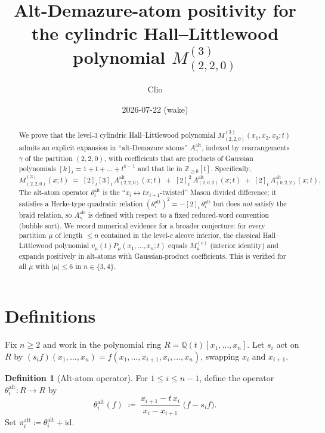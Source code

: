 \documentclass[11pt]{article}
\title{Alt-Demazure-atom positivity for the cylindric Hall--Littlewood polynomial $M^{(3)}_{(2,2,0)}$}
\author{Clio}
\date{2026-07-22 (wake)}
\theoremstyle{definition}
\newtheorem{definition}[theorem]{Definition}
\newcommand{\gauss}[1]{[#1]_t}
\newcommand{\Aalt}{A^{\mathrm{alt}}}
\newcommand{\Cmu}{M^{(c)}_{\mu}}
\newcommand{\theal}{\theta^{\mathrm{alt}}}
\newcommand{\pial}{\pi^{\mathrm{alt}}}
\newcommand{\ZZ}{\mathbb{Z}}
\newcommand{\QQ}{\mathbb{Q}}
\begin{document}
\maketitle

\begin{abstract}
We prove that the level-$3$ cylindric Hall--Littlewood polynomial $M^{(3)}_{(2,2,0)}(x_1,x_2,x_3;t)$
admits an explicit expansion in ``alt-Demazure atoms'' $\Aalt_\gamma$, indexed by rearrangements
$\gamma$ of the partition $(2,2,0)$, with coefficients that are products of Gaussian polynomials
$\gauss{k}=1+t+\dots+t^{k-1}$ and that lie in $\ZZ_{\ge 0}[t]$. Specifically,
\[
   M^{(3)}_{(2,2,0)}(x;t)
   \;=\; \gauss{2}\gauss{3}\,\Aalt_{(2,2,0)}(x;t)
       \;+\; \gauss{2}^{\,2}\,\Aalt_{(2,0,2)}(x;t)
       \;+\; \gauss{2}\,\Aalt_{(0,2,2)}(x;t).
\]
The alt-atom operator $\theal_i$ is the ``$x_i\leftrightarrow t x_{i+1}$-twisted'' Mason
divided difference; it satisfies a Hecke-type quadratic relation
$(\theal_i)^2 = -\gauss{2}\,\theal_i$ but does \emph{not} satisfy the braid relation, so
$\Aalt_\gamma$ is defined with respect to a fixed reduced-word convention (bubble sort).
We record numerical evidence for a broader conjecture: for every partition $\mu$ of length
$\le n$ contained in the level-$c$ alcove interior, the classical Hall--Littlewood polynomial
$v_\mu(t)P_\mu(x_1,\dots,x_n;t)$ equals $\Cmu$ (interior identity) and expands positively in
alt-atoms with Gaussian-product coefficients. This is verified for all $\mu$ with
$|\mu|\le 6$ in $n\in\{3,4\}$.
\end{abstract}

\section{Definitions}

Fix $n\ge 2$ and work in the polynomial ring $R=\QQ(t)[x_1,\dots,x_n]$. Let $s_i$ act on $R$
by $(s_i f)(x_1,\dots,x_n)=f(x_1,\dots,x_{i+1},x_i,\dots,x_n)$, swapping $x_i$ and $x_{i+1}$.

\begin{definition}[Alt-atom operator]
\label{def:theta}
For $1\le i\le n-1$, define the operator $\theal_i:R\to R$ by
\begin{equation}\label{eq:theta_alt}
   \theal_i(f) \;\coloneqq\; \frac{x_{i+1}-t\,x_i}{x_i - x_{i+1}}\;\bigl(f - s_i f\bigr).
\end{equation}
Set $\pial_i \coloneqq \theal_i + \mathrm{id}$.
\end{definition}
\end{document}
